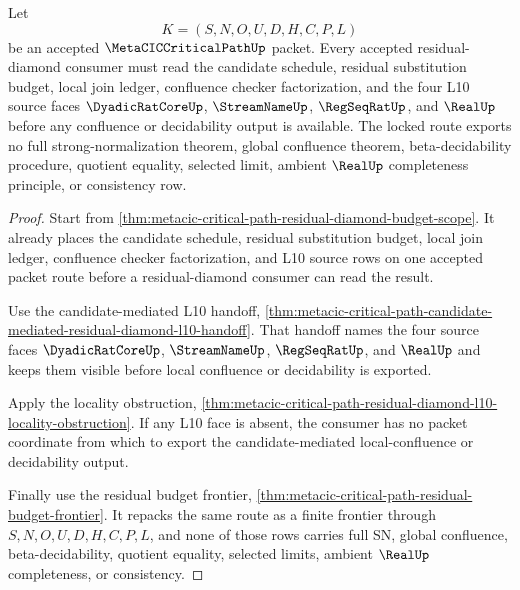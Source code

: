 \begin{theorem}
\label{thm:metacic-critical-path-residual-diamond-source-order-lock}
Let
$$
K=(S,N,O,U,D,H,C,P,L)
$$
be an accepted $\MetaCICCriticalPathUp$ packet. Every accepted residual-diamond consumer must read the candidate schedule, residual substitution budget, local join ledger, confluence checker factorization, and the four L10 source faces $\DyadicRatCoreUp$, $\StreamNameUp$, $\RegSeqRatUp$, and $\RealUp$ before any confluence or decidability output is available. The locked route exports no full strong-normalization theorem, global confluence theorem, beta-decidability procedure, quotient equality, selected limit, ambient $\RealUp$ completeness principle, or consistency row.
\end{theorem}
\begin{proof}
Start from \autoref{thm:metacic-critical-path-residual-diamond-budget-scope}. It already places the candidate schedule, residual substitution budget, local join ledger, confluence checker factorization, and L10 source rows on one accepted packet route before a residual-diamond consumer can read the result.

Use the candidate-mediated L10 handoff, \autoref{thm:metacic-critical-path-candidate-mediated-residual-diamond-l10-handoff}. That handoff names the four source faces $\DyadicRatCoreUp$, $\StreamNameUp$, $\RegSeqRatUp$, and $\RealUp$ and keeps them visible before local confluence or decidability is exported.

Apply the locality obstruction, \autoref{thm:metacic-critical-path-residual-diamond-l10-locality-obstruction}. If any L10 face is absent, the consumer has no packet coordinate from which to export the candidate-mediated local-confluence or decidability output.

Finally use the residual budget frontier, \autoref{thm:metacic-critical-path-residual-budget-frontier}. It repacks the same route as a finite frontier through $S,N,O,U,D,H,C,P,L$, and none of those rows carries full SN, global confluence, beta-decidability, quotient equality, selected limits, ambient $\RealUp$ completeness, or consistency.
\end{proof}

